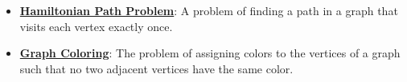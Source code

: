 \documentclass{article}%
\begin{document}
\begin{itemize}[leftmargin=*]
\item \href{https://purdue.brightspace.com/d2l/common/assets/pdfjs-d2l-dist/1.0.14-legacy/web/viewer.html?file=%2Fcontent%2Fenforced%2F1095467-wl.202510.CS.24300.001%2F15L2-SAT.pdf%3Fou%3D1095467&lang=en-us&container=d2l-fileviewer-rendered-pdf&fullscreen=d2l-fileviewer-rendered-pdf-dialog&height=667#page=40}{\textbf{Hamiltonian Path Problem}}: A problem of finding a path in a graph that visits each vertex exactly once.%
\item \href{https://purdue.brightspace.com/d2l/common/assets/pdfjs-d2l-dist/1.0.14-legacy/web/viewer.html?file=%2Fcontent%2Fenforced%2F1095467-wl.202510.CS.24300.001%2F15L2-SAT.pdf%3Fou%3D1095467&lang=en-us&container=d2l-fileviewer-rendered-pdf&fullscreen=d2l-fileviewer-rendered-pdf-dialog&height=667#page=47}{\textbf{Graph Coloring}}: The problem of assigning colors to the vertices of a graph such that no two adjacent vertices have the same color.%
\end{itemize}%
\end{document}
